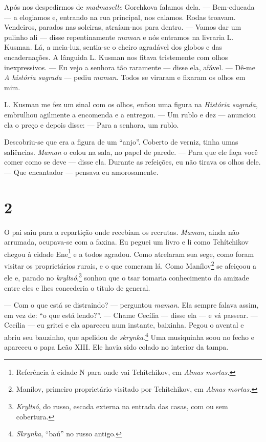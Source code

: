 Após nos despedirmos de \emph{madmaselle} Gorchkova falamos dela. ---
Bem-educada --- a elogiamos e, entrando na rua principal, nos calamos.
Rodas troavam. Vendeiros, parados nas soleiras, atraíam-nos para dentro.
--- Vamos dar um pulinho ali --- disse repentinamente \emph{maman} e nós
entramos na livraria L. Kusman. Lá, a meia-luz, sentia-se o cheiro
agradável dos globos e das encadernações. A lânguida L. Kusman nos
fitava tristemente com olhos inexpressivos. --- Eu vejo a senhora tão
raramente --- disse ela, afável. --- Dê-me \emph{A história sagrada} ---
pediu \emph{maman}. Todos se viraram e fixaram os olhos em mim.

L. Kusman me fez um sinal com os olhos, enfiou uma figura na
\emph{História sagrada}, embrulhou agilmente a encomenda e a entregou.
--- Um rublo e dez --- anunciou ela o preço e depois disse: --- Para a
senhora, um rublo.

Descobriu-se que era a figura de um ``anjo''. Coberto de verniz, tinha
umas saliências. \emph{Maman} o colou na sala, no papel de parede. ---
Para que ele faça você comer como se deve --- disse ela. Durante as
refeições, eu não tirava os olhos dele. --- Que encantador --- pensava
eu amorosamente.

\section{2}

O pai saiu para a repartição onde recebiam os recrutas. \emph{Maman},
ainda não arrumada, ocupava-se com a faxina. Eu peguei um livro e li
como Tchítchikov chegou à cidade Ene\footnote{Referência à cidade N para
  onde vai Tchítchikov, em \emph{Almas mortas. }} e a todos agradou.
Como atrelaram sua sege, como foram visitar os proprietários rurais, e o
que comeram lá. Como Manílov\footnote{Manílov, primeiro proprietário
  visitado por Tchítchikov, em \emph{Almas mortas. }} se afeiçoou a ele
e, parado no \emph{kryltsó},\footnote{\emph{Kryltsó}, do russo, escada
  externa na entrada das casas, com ou sem cobertura.} sonhou que o tsar
tomaria conhecimento da amizade entre eles e lhes concederia o título de
general.

--- Com o que está se distraindo? --- perguntou \emph{maman}. Ela sempre
falava assim, em vez de: ``o que está lendo?''. --- Chame Cecília ---
disse ela --- e vá passear. --- Cecília --- eu gritei e ela apareceu num
instante, baixinha. Pegou o avental e abriu seu bauzinho, que apelidou
de \emph{skrynka}.\footnote{\emph{Skrynka}, ``baú'' no russo antigo.}
Uma musiquinha soou no fecho e apareceu o papa Leão XIII. Ele havia sido
colado no interior da tampa.

